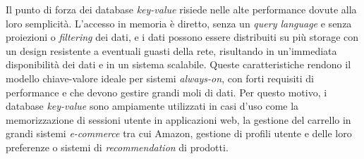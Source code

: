 Il punto di forza dei database \textit{key-value} risiede nelle alte performance dovute alla loro semplicità. L'accesso in memoria è diretto, senza un \textit{query language} e senza proiezioni o \textit{filtering} dei dati, e i dati possono essere distribuiti su più storage con un design resistente a eventuali guasti della rete, risultando in un'immediata disponibilità dei dati e in un sistema scalabile. Queste caratteristiche rendono il modello chiave-valore ideale per sistemi \textit{always-on}, con forti requisiti di performance e che devono gestire grandi moli di dati. Per questo motivo, i database \textit{key-value} sono ampiamente utilizzati in casi d'uso come la memorizzazione di sessioni utente in applicazioni web, la gestione del carrello in grandi sistemi \textit{e-commerce} tra cui Amazon, gestione di profili utente e delle loro preferenze o sistemi di \textit{recommendation} di prodotti.





